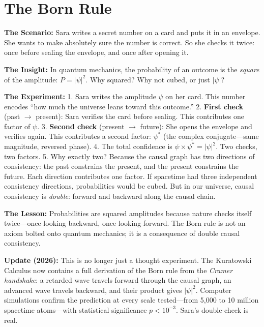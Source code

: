 \documentclass[11pt, a4paper, openany]{book}
\begin{document}
\section{The Born Rule}
\begin{thoughtexp}
\textbf{The Scenario:} Sara writes a secret number on a card and puts it in an envelope. She wants to make absolutely sure the number is correct. So she checks it twice: once before sealing the envelope, and once after opening it.

\textbf{The Insight:} In quantum mechanics, the probability of an outcome is the \emph{square} of the amplitude: $P = |\psi|^2$. Why squared? Why not cubed, or just $|\psi|$?

\textbf{The Experiment:}
1. Sara writes the amplitude $\psi$ on her card. This number encodes ``how much the universe leans toward this outcome.''
2. \textbf{First check} (past $\to$ present): Sara verifies the card before sealing. This contributes one factor of $\psi$.
3. \textbf{Second check} (present $\to$ future): She opens the envelope and verifies again. This contributes a second factor: $\psi^*$ (the complex conjugate---same magnitude, reversed phase).
4. The total confidence is $\psi \times \psi^* = |\psi|^2$. Two checks, two factors.
5. Why exactly two? Because the causal graph has two directions of consistency: the past constrains the present, and the present constrains the future. Each direction contributes one factor. If spacetime had three independent consistency directions, probabilities would be cubed. But in our universe, causal consistency is \emph{double}: forward and backward along the causal chain.

\textbf{The Lesson:} Probabilities are squared amplitudes because nature checks itself twice---once looking backward, once looking forward. The Born rule is not an axiom bolted onto quantum mechanics; it is a consequence of double causal consistency.

\textbf{Update (2026):} This is no longer just a thought experiment. The Kuratowski Calculus now contains a full derivation of the Born rule from the \emph{Cramer handshake}: a retarded wave travels forward through the causal graph, an advanced wave travels backward, and their product gives $|\psi|^2$. Computer simulations confirm the prediction at every scale tested---from 5,000 to 10 million spacetime atoms---with statistical significance $p < 10^{-3}$. Sara's double-check is real.
\end{thoughtexp}
\end{document}
